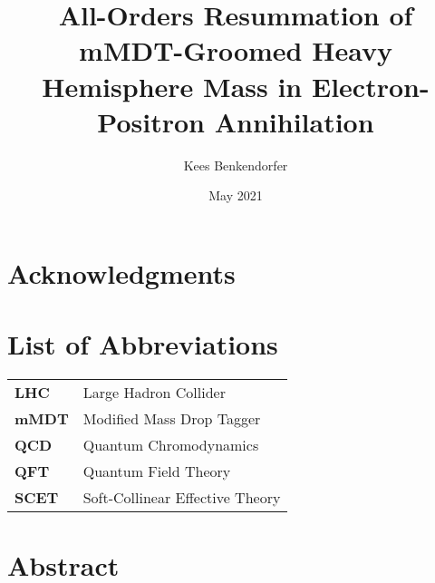 \documentclass[12pt,twoside]{reedthesis}
\title{All-Orders Resummation of mMDT-Groomed Heavy Hemisphere Mass in Electron-Positron Annihilation}
\author{Kees Benkendorfer}
\date{May 2021}
\begin{document}
  \maketitle
  \frontmatter %
  \pagestyle{empty} %

    \chapter*{Acknowledgments}

    

	
	

    \chapter*{List of Abbreviations}

	\begin{table}[h]
	\centering %
	\begin{tabular}{ll}
		\textbf{LHC}  	&  Large Hadron Collider \\
		\textbf{mMDT}  	&  Modified Mass Drop Tagger \\
		\textbf{QCD}  	&  Quantum Chromodynamics \\
		\textbf{QFT}  	&  Quantum Field Theory \\
		\textbf{SCET}  	&  Soft-Collinear Effective Theory\\
	\end{tabular}
	\end{table}
	

    \tableofcontents

    \chapter*{Abstract}
	
	
\end{document}
